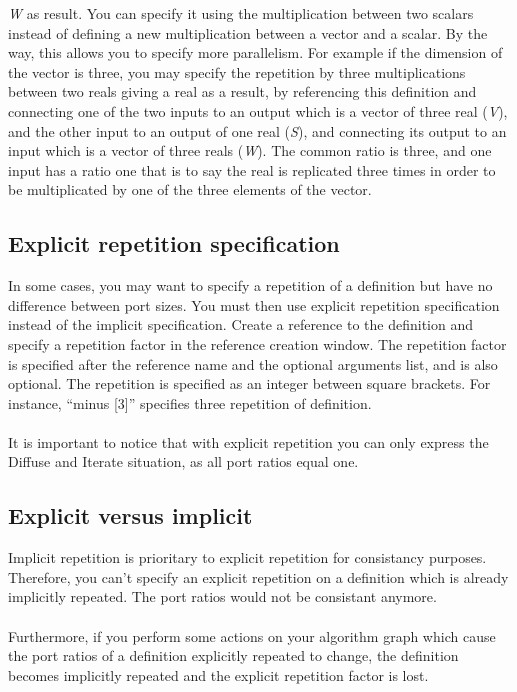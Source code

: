 \documentclass[11pt,twoside]{report}
\begin{document}
{\it W} as result. You can specify it using the multiplication between
two scalars instead of defining a new multiplication between a vector
and a scalar. By the way, this allows you to specify more parallelism.
For example if the dimension of the vector is three, you may specify
the repetition by three multiplications between two reals giving a
real as a result, by referencing this definition and connecting one of
the two inputs to an output which is a vector of three real ({\it V}),
and the other input to an output of one real ({\it S}), and connecting
its output to an input which is a vector of three reals ({\it W}). The
common ratio is three, and one input has a ratio one that is to say
the real is replicated three times in order to be multiplicated by one
of the three elements of the vector.

\subsection{Explicit repetition specification}
In some cases, you may want to specify a repetition of a definition
but have no difference between port sizes. You must then use explicit
repetition specification instead of the implicit specification. Create
a reference to the definition and specify a repetition factor in the
reference creation window. The repetition factor is specified after
the reference name and the optional arguments list, and is also
optional. The repetition is specified as an integer between square
brackets. For instance, ``minus [3]'' specifies three repetition of definition.\\\\
It is important to notice that with explicit repetition you can only
express the Diffuse and Iterate situation, as all port ratios equal
one.

\subsection{Explicit versus implicit}
Implicit repetition is prioritary to explicit repetition for
consistancy purposes. Therefore, you can't specify an explicit
repetition on a definition which is already implicitly repeated. The
port ratios would not be consistant anymore.\\\\
Furthermore, if you perform some actions on your algorithm graph which cause
the port ratios of a definition explicitly repeated to change, the
definition becomes implicitly repeated and the explicit repetition
factor is lost.
\end{document}
